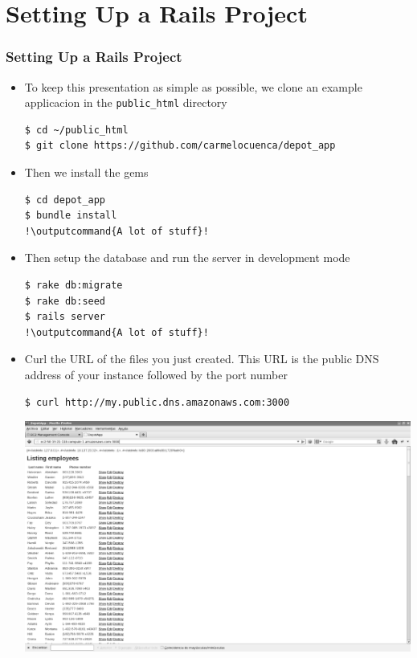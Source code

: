 \documentclass{beamer}
\newcommand{\outputcommand}[1]{\color{darkgreen}{#1}}
\begin{document}
\section{Setting Up a Rails Project}
\begin{frame}
\frametitle{Setting Up a Rails Project}
\begin{itemize}
\item To keep this presentation as simple as possible, we clone an example applicacion in the \texttt{public\_html} directory 

\lstset{language=shell, escapechar=!}
\begin{lstlisting}[escapechar=!]
$ cd ~/public_html
$ git clone https://github.com/carmelocuenca/depot_app
\end{lstlisting}

\item Then we install the gems 

\lstset{language=shell, escapechar=!}
\begin{lstlisting}[escapechar=!]
$ cd depot_app
$ bundle install
!\outputcommand{A lot of stuff}!
\end{lstlisting}

\item Then setup the database and run the server in development mode

\lstset{language=shell, escapechar=!}
\begin{lstlisting}[escapechar=!]
$ rake db:migrate
$ rake db:seed
$ rails server
!\outputcommand{A lot of stuff}!
\end{lstlisting}

\item Curl the URL of the files you just created.
This URL is the public DNS address of your instance followed by the port number

\begin{lstlisting}[escapechar=!]
$ curl http://my.public.dns.amazonaws.com:3000
\end{lstlisting}

\includegraphics[width=0.75 \textwidth]{tienda.eps}
\end{itemize}
\end{frame}
\end{document}
